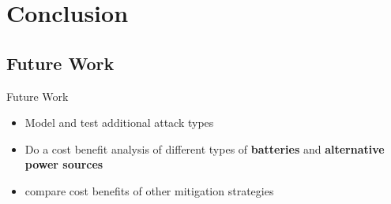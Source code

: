 \documentclass{beamer}
\begin{document}
\section{Conclusion}

\subsection{Future Work}
\begin{frame}{Future Work}
\begin{itemize}

	\item Model and test additional attack types 
	\item Do a cost benefit analysis of different types of \textbf{batteries} and \textbf{alternative power sources}
	\item compare cost benefits of other mitigation strategies 

\end{itemize}
\end{frame}	
\end{document}
